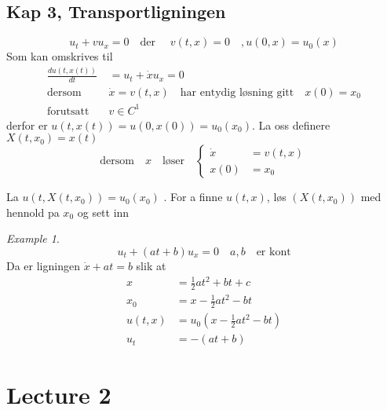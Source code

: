 \documentclass{article}
\theoremstyle{remark}
\newtheorem{example}{Example}
\begin{document}
 \subsection{Kap 3, Transportligningen}%
 \label{sub:kap_3_transportligningen}

 \[
 u_{t} + v u_{x} =0 \quad  \text{der } \quad  v\left( t,x \right) = 0 \quad  , u\left( 0,x \right) = u_{0} \left( x \right)   
 \] 
 Som kan omskrives til \[
   \begin{split}
 \frac{d u\left( t,x\left( t \right) \right)}{d t} &= u_{t} + \dot{x} u_{x} = 0  \\
 \text{dersom} \quad  & \dot{x} = v\left( t,x \right) \quad \text{har entydig løsning gitt}\quad x\left( 0 \right) = x_{0} \\
 \text{forutsatt} \quad   &  v \in C^{1} 
   \end{split}
 \] 
 derfor er $u\left( t, x\left( t \right) \right) = u\left( 0, x\left( 0 \right) \right) = u_{0} \left( x_{0} \right)$. La oss definere $X\left( t, x_{0} \right) = x\left( t \right)$ \[
 \text{dersom} \quad  x \quad \text{løser} \quad \begin{cases}
   \dot{x} &= v\left( t,x \right) \\
   x\left( 0 \right) &= x_{0}  
 \end{cases}  
 \] 

 La $u\left( t, X\left( t,x_{0} \right) \right) = u_{0} \left( x_{0} \right)$ . For a finne $u\left( t,x \right)$, løs $\left( X\left( t,x_{0} \right) \right)$ med hennold 
 pa $x_{0} $ og sett inn  
 
 \begin{example}
   \[
   u_{t} + \left( at +b \right)u_{x} = 0  \quad  a,b \quad \text{er kont}  
   \]
   Da er ligningen $\dot{x} + at = b$ slik at \[
   \begin{split}
     x &=  \frac{1}{2} at^2  + bt  +c\\
     x_{0} &=  x - \frac{1}{2  } at^2 - bt \\
     u\left( t,x \right) &= u_{0} \left( x-\frac{1}{2} at^2 -bt \right)\\
     u_{t} &= -\left( at +b \right)
   \end{split}
   \] 
 \end{example}



\newpage
\section{Lecture 2}%
\label{sec:lecture_2}
\end{document}
